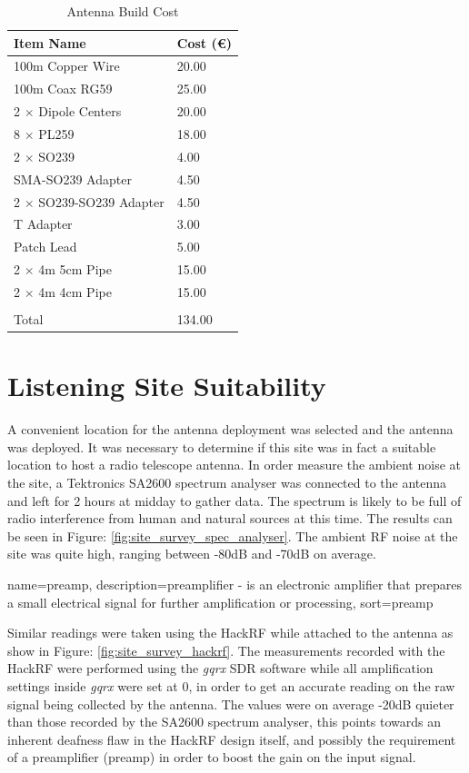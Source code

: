 \documentclass[runningheads,a4paper]{llncs}
\begin{document}
%
\begin{table}
  \centering
  \begin{tabular}{p{8cm} l}
    \toprule
    Item Name & Cost (\euro) \\ \midrule
    100m Copper Wire & 20.00  \\
    100m Coax RG59 & 25.00  \\
    2 $\times$ Dipole Centers & 20.00 \\
    8 $\times$ PL259 & 18.00 \\
    2 $\times$ SO239 & 4.00 \\
    SMA-SO239 Adapter & 4.50 \\
    2 $\times$ SO239-SO239 Adapter & 4.50 \\
    T Adapter & 3.00 \\
    Patch Lead & 5.00 \\
    2 $\times$ 4m 5cm Pipe & 15.00 \\
    2 $\times$ 4m 4cm Pipe & 15.00 \\
    \bottomrule
    \\
    Total & 134.00
  \end{tabular}
  \caption{Antenna Build Cost}
  \label{tab:antenna_build_cost}
\end{table}
%


\section*{Listening Site Suitability}
A convenient location for the antenna deployment was selected and the antenna was deployed. It was necessary to determine if this site was in fact a suitable location to host a radio telescope antenna. In order measure the ambient noise at the site, a Tektronics SA2600 spectrum analyser was connected to the antenna and left for 2 hours at midday to gather data. The spectrum is likely to be full of radio interference from human and natural sources at this time. The results can be seen in Figure: \ref{fig:site_survey_spec_analyser}. The ambient \gls{RF} noise at the site was quite high, ranging between -80dB and -70dB on average. 

{
  name={preamp},
  description={preamplifier - is an electronic amplifier that prepares a small electrical signal for further amplification or processing},
  sort=preamp
}

Similar readings were taken using the HackRF while attached to the antenna as show in Figure: \ref{fig:site_survey_hackrf}. The measurements recorded with the HackRF were performed using the \textit{gqrx} \gls{SDR} software while all amplification settings inside \textit{gqrx} were set at 0, in order to get an accurate reading on the raw signal being collected by the antenna. The values were on average -20dB quieter than those recorded by the SA2600 spectrum analyser, this points towards an inherent deafness flaw in the HackRF design itself, and possibly the requirement of a preamplifier (\gls{preamp}) in order to boost the gain on the input signal. 
\end{document}
